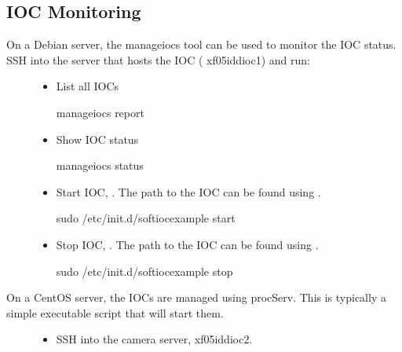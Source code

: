 \documentclass[letterpaper,10pt,english]{sphinxmanual}
\begin{document}
\subsection{IOC Monitoring}
\label{\detokenize{staff:ioc-monitoring}}\begin{description}
\item[{On a Debian server, the manage\sphinxhyphen{}iocs tool can be used to monitor the IOC status. SSH into the server that hosts the IOC ( xf05idd\sphinxhyphen{}ioc1) and run:}] \leavevmode\begin{itemize}
\item {} 
\sphinxAtStartPar
List all IOCs

\begin{sphinxVerbatim}[commandchars=\\\{\}]
\PYGZdl{} manage\PYGZhy{}iocs report
\end{sphinxVerbatim}

\item {} 
\sphinxAtStartPar
Show IOC status

\begin{sphinxVerbatim}[commandchars=\\\{\}]
\PYGZdl{} manage\PYGZhy{}iocs status
\end{sphinxVerbatim}

\item {} 
\sphinxAtStartPar
Start IOC, . The path to the IOC can be found using .

\begin{sphinxVerbatim}[commandchars=\\\{\}]
\PYGZdl{} sudo /etc/init.d/softioc\PYGZhy{}example start
\end{sphinxVerbatim}

\item {} 
\sphinxAtStartPar
Stop IOC, . The path to the IOC can be found using .

\begin{sphinxVerbatim}[commandchars=\\\{\}]
\PYGZdl{} sudo /etc/init.d/softioc\PYGZhy{}example stop
\end{sphinxVerbatim}

\end{itemize}

\item[{On a CentOS server, the IOCs are managed using procServ. This is typically a simple executable script that will start them.}] \leavevmode\begin{itemize}
\item {} 
\sphinxAtStartPar
SSH into the camera server, xf05idd\sphinxhyphen{}ioc2.


\end{itemize}
\end{description}
\end{document}
